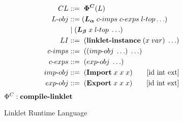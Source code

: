 \documentclass[sigplan,screen,anonymous]{acmart}
\def\dash {\text{-}}
\begin{document}
\def\la {\bm{L_\alpha}}
\def\lb {\bm{L_\beta}}
\def\lc {\bm{L_\gamma}}



\begin{figure}[tbp]
  \begin{align*}
    CL             &::=\; \bm{\Phi^C}(L)\\
    L\dash obj     &::= (\la\; c\dash imps \; c\dash exps \; l\dash top \ldots)\\
    \;           &\;|\; (\lb\; x\; l\dash top\; \ldots) \\
    LI             &::=\; (\textbf{linklet\dash instance}\; (x\; var)\; \ldots) \\
    c\dash imps    &::=\; ((imp\dash obj\; \ldots)\; \ldots)\\
    c\dash exps    &::=\; (exp\dash obj\; \ldots)\\
    imp\dash obj   &::=\; (\textbf{Import}\; x\; x\; x) \tag*{[id int ext]} \\
    exp\dash obj   &::=\; (\textbf{Export}\; x\; x\; x) \tag*{[id int ext]} \\
  \end{align*}
  \hfill \footnotesize $\Phi^C : \textbf{compile\dash linklet}$
\caption{Linklet Runtime Language}
\label{fig:linklet-runtime}
\end{figure}
\end{document}
